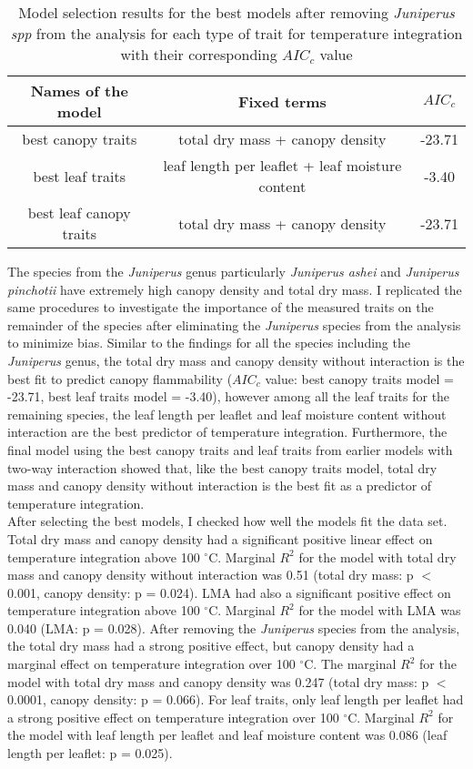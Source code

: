 \documentclass[12pt]{report}
\begin{document}
\begin{table}
\centering
\begin{tabular}{|c | c | c|}
       \hline
       \textbf{Names of the model} & \textbf{Fixed terms} & \textbf{$AIC_{c}$} \\
       \hline
       best canopy traits  & total dry mass + canopy density & -23.71 \\
       \hline
       best leaf traits    & leaf length per leaflet + leaf moisture content & -3.40 \\
       \hline
       best leaf canopy traits   & total dry mass + canopy density & -23.71\\
       \hline
\end{tabular}
\caption{Model selection results for the best models after removing \emph{Juniperus spp} from the  analysis for each type of trait for temperature integration with their corresponding  $AIC_{c}$ value}
\end{table} 


The species from the \emph{Juniperus} genus particularly \emph{Juniperus ashei} and \emph{Juniperus pinchotii} have extremely high canopy density and total dry mass. I replicated the same procedures to investigate the importance of the measured traits on the remainder of the species after eliminating the \emph{Juniperus} species from the analysis to minimize bias. Similar to the findings for all the species including the \emph{Juniperus} genus, the total dry mass and canopy density without interaction is the best fit to predict canopy flammability ($AIC_{c}$ value: best canopy traits model = -23.71, best leaf traits model = -3.40), however among all the leaf traits for the remaining species, the leaf length per leaflet and leaf moisture content without interaction are the best predictor of temperature integration. Furthermore, the final model using the best canopy traits and leaf traits from earlier models with two-way interaction showed that, like the best canopy traits model, total dry mass and canopy density without interaction is the best fit as a predictor of temperature integration.\\

After selecting the best models, I checked how well the models fit the data set. Total dry mass and canopy density had a significant positive linear effect on temperature integration above 100 $^{\circ}$C. Marginal $R^2$ for the model with total dry mass and canopy density without interaction was 0.51 (total dry mass: p $<$ 0.001, canopy density: p = 0.024). LMA had also a significant positive effect on temperature integration above 100 $^{\circ}$C. Marginal $R^2$ for the model with LMA was 0.040 (LMA: p = 0.028). After removing the \emph{Juniperus} species from the analysis, the total dry mass had a strong positive effect, but canopy density had a marginal effect on temperature integration over 100 $^{\circ}$C. The marginal $R^2$ for the model with total dry mass and canopy density was 0.247 (total dry mass: p $<$ 0.0001, canopy density: p = 0.066). For leaf traits, only leaf length per leaflet had a strong positive effect on temperature integration over 100 $^{\circ}$C.  Marginal $R^2$ for the model with leaf length per leaflet and leaf moisture content was 0.086 (leaf length per leaflet: p = 0.025).
\end{document}
